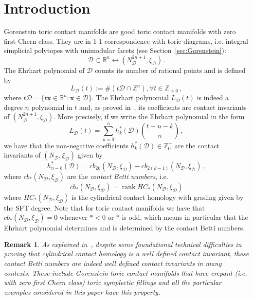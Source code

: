 \documentclass[a4paper,11pt,reqno]{amsart}
\newcommand{\R}{\mathbb R}
\newcommand{\Z}{\mathbb Z}
\newcommand{\Dd}{{\mathcal D}}
\DeclareMathOperator{\rank}{rank}
\newtheorem{remark}[theorem]{Remark}
\begin{document}
\maketitle

\section{Introduction}
\label{sec:intro}

Gorenstein toric contact manifolds are good toric contact manifolds with zero first Chern class. 
They are in $1$-$1$ correspondence with toric diagrams, i.e. integral simplicial polytopes with
unimodular facets (see Section~\ref{sec:Gorenstein}):
\[
\Dd \subset \R^n  \longleftrightarrow (N^{2n+1}_\Dd, \xi_\Dd) \,.
\]
The Ehrhart polynomial of $\Dd$ counts its number of rational points and is defined by
\[
L_{\mathcal{D}}(t) := \#(t\mathcal{D} \cap \mathbb{Z}^n), \forall t \in \mathbb{Z}_{> 0}\,,
\]
where $t\mathcal{D}=\{t \bm{x} \in \mathbb{R}^n: \bm{x} \in \mathcal{D}\}$. The Ehrhart polynomial
$L_{\mathcal{D}}(t)$ is indeed a degree $n$ polynomial in $t$ and, as proved in~\cite{AMM}, its
coefficients are contact invariants of $(N^{2n+1}_\Dd, \xi_\Dd)$. More precisely, if we write the Ehrhart
polynomial in the form
\[
L_{\Dd} (t) = \sum_{k=0}^n h^\ast_k (\Dd) \binom{t+n-k}{n}\,,
\]
we have that the non-negative coefficients $h^\ast_k (\Dd) \in \Z^+_0$ are the contact invariants of 
$(N_{\Dd}, \xi_{\Dd})$ given by
\[
h^\ast_{n-k} (\Dd) = cb_{2k} (N_{\Dd}, \xi_{\Dd}) - cb_{2(k-1)} (N_{\Dd}, \xi_{\Dd})\,,
\]
where $cb_{\ast} (N_{\Dd}, \xi_{\Dd})$ are the \emph{contact Betti numbers}, i.e.
\[
cb_{\ast} (N_{\Dd}, \xi_{\Dd}) = \rank HC_\ast (N_\Dd, \xi_\Dd)
\] 
where  $HC_\ast (N_\Dd, \xi_\Dd)$ is the cylindrical contact homology with grading given by the SFT degree.
Note that for toric contact manifolds we have that $cb_\ast (N_\Dd, \xi_\Dd) = 0$ whenever $\ast <0$ or 
$\ast$ is odd, which means in particular that the Ehrhart polynomial determines and is determined by
the contact Betti numbers.
\begin{remark} \label{rem:well-defined}
As explained in~\cite{AMM}, despite some foundational technical difficulties in proving that cylindrical contact
homology is a well defined contact invariant, these contact Betti numbers are indeed well defined contact
invariants in many contexts. These include Gorenstein toric contact manifolds that have crepant 
(i.e. with zero first Chern class) toric symplectic fillings and all the particular examples considered in this 
paper have this property.
\end{remark}
\end{document}
